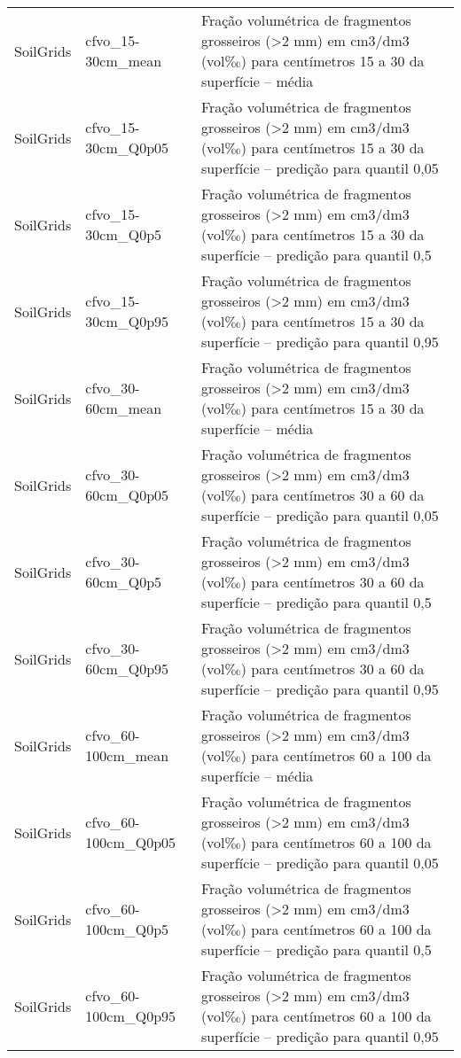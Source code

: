 \begin{longtable}{@{} p{4cm} p{4cm} p{8cm} @{}}
	SoilGrids &
	cfvo\_15-30cm\_mean &
	Fração volumétrica de fragmentos grosseiros (\textgreater 2 mm) em cm3/dm3 (vol‰) para centímetros 15 a 30 da superfície – média \\
	SoilGrids &
	cfvo\_15-30cm\_Q0p05 &
	Fração volumétrica de fragmentos grosseiros (\textgreater 2 mm) em cm3/dm3 (vol‰) para centímetros 15 a 30 da superfície – predição para quantil 0,05 \\
	SoilGrids &
	cfvo\_15-30cm\_Q0p5 &
	Fração volumétrica de fragmentos grosseiros (\textgreater 2 mm) em cm3/dm3 (vol‰) para centímetros 15 a 30 da superfície – predição para quantil 0,5 \\
	SoilGrids &
	cfvo\_15-30cm\_Q0p95 &
	Fração volumétrica de fragmentos grosseiros (\textgreater 2 mm) em cm3/dm3 (vol‰) para centímetros 15 a 30 da superfície – predição para quantil 0,95 \\
	SoilGrids &
	cfvo\_30-60cm\_mean &
	Fração volumétrica de fragmentos grosseiros (\textgreater 2 mm) em cm3/dm3 (vol‰) para centímetros 15 a 30 da superfície – média \\
	SoilGrids &
	cfvo\_30-60cm\_Q0p05 &
	Fração volumétrica de fragmentos grosseiros (\textgreater 2 mm) em cm3/dm3 (vol‰) para centímetros 30 a 60 da superfície – predição para quantil 0,05 \\
	SoilGrids &
	cfvo\_30-60cm\_Q0p5 &
	Fração volumétrica de fragmentos grosseiros (\textgreater 2 mm) em cm3/dm3 (vol‰) para centímetros 30 a 60 da superfície – predição para quantil 0,5 \\
	SoilGrids &
	cfvo\_30-60cm\_Q0p95 &
	Fração volumétrica de fragmentos grosseiros (\textgreater 2 mm) em cm3/dm3 (vol‰) para centímetros 30 a 60 da superfície – predição para quantil 0,95 \\
	SoilGrids &
	cfvo\_60-100cm\_mean &
	Fração volumétrica de fragmentos grosseiros (\textgreater 2 mm) em cm3/dm3 (vol‰) para centímetros 60 a 100 da superfície – média \\
	SoilGrids &
	cfvo\_60-100cm\_Q0p05 &
	Fração volumétrica de fragmentos grosseiros (\textgreater 2 mm) em cm3/dm3 (vol‰) para centímetros 60 a 100 da superfície – predição para quantil 0,05 \\
	SoilGrids &
	cfvo\_60-100cm\_Q0p5 &
	Fração volumétrica de fragmentos grosseiros (\textgreater 2 mm) em cm3/dm3 (vol‰) para centímetros 60 a 100 da superfície – predição para quantil 0,5 \\
	SoilGrids &
	cfvo\_60-100cm\_Q0p95 &
	Fração volumétrica de fragmentos grosseiros (\textgreater 2 mm) em cm3/dm3 (vol‰) para centímetros 60 a 100 da superfície – predição para quantil 0,95 \\

\end{longtable}
